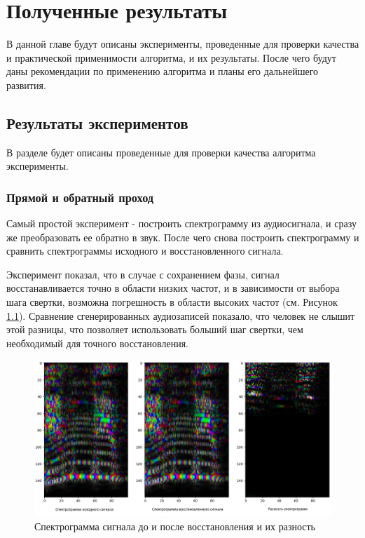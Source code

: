 \chapter{Полученные результаты}

В данной главе будут описаны эксперименты, проведенные для проверки качества и практической применимости алгоритма, и их результаты.
После чего будут даны рекомендации по применению алгоритма и планы его дальнейшего развития.

\section{Результаты экспериментов}
\label{sec:sec_3_1}

В разделе будет описаны проведенные для проверки качества алгоритма эксперименты.

\subsection{Прямой и обратный проход}
Самый простой эксперимент - построить спектрограмму из аудиосигнала, и сразу же преобразовать ее обратно в звук. 
После чего снова построить спектрограмму и сравнить спектрограммы исходного и восстановленного сигнала.

Эксперимент показал, что в случае с сохранением фазы, сигнал восстанавливается точно в области низких частот,
и в зависимости от выбора шага свертки, возможна погрешность в области высоких частот (см. Рисунок \ref{fig:spec_diff_results}).
Сравнение сгенерированных аудиозаписей показало, что человек не слышит этой разницы, что позволяет использовать 
больший шаг свертки, чем необходимый для точного восстановления.

\begin{figure}
  \centering
  \includegraphics[width=0.8\linewidth]{figures/spec_diff}
  \caption{Спектрограмма сигнала до и после восстановления и их разность}
  \label{fig:spec_diff_results}
\end{figure}


